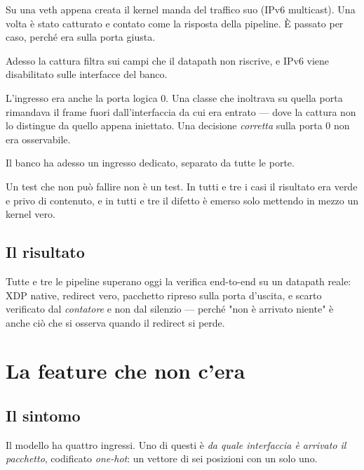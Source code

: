 \documentclass[11pt,a4paper,oneside]{report}
\begin{document}
\begin{prima}
Su una veth appena creata il kernel manda del traffico suo (IPv6 multicast). Una
volta è stato catturato e contato come la risposta della pipeline. È passato per
caso, perché era sulla porta giusta.

Adesso la cattura filtra sui campi che il datapath non riscrive, e IPv6 viene
disabilitato sulle interfacce del banco.
\end{prima}

\begin{prima}
L'ingresso era anche la porta logica 0. Una classe che inoltrava su quella porta
rimandava il frame fuori dall'interfaccia da cui era entrato --- dove la cattura
non lo distingue da quello appena iniettato. Una decisione \emph{corretta} sulla
porta 0 non era osservabile.

Il banco ha adesso un ingresso dedicato, separato da tutte le porte.
\end{prima}

\begin{lezione}
Un test che non può fallire non è un test. In tutti e tre i casi il risultato
era verde e privo di contenuto, e in tutti e tre il difetto è emerso solo
mettendo in mezzo un kernel vero.
\end{lezione}

\section{Il risultato}

Tutte e tre le pipeline superano oggi la verifica end-to-end su un datapath
reale: XDP native, redirect vero, pacchetto ripreso sulla porta d'uscita, e
scarto verificato dal \emph{contatore} e non dal silenzio --- perché "non è
arrivato niente" è anche ciò che si osserva quando il redirect si perde.

\chapter{La feature che non c'era}

\section{Il sintomo}

Il modello ha quattro ingressi. Uno di questi è \emph{da quale interfaccia è
arrivato il pacchetto}, codificato \emph{one-hot}: un vettore di sei posizioni
con un solo uno.
\end{document}
